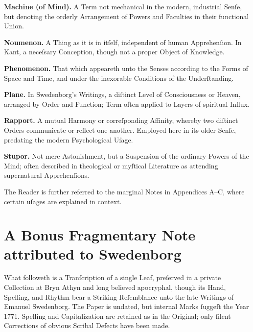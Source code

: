 \documentclass[12pt]{book}
\begin{document}
\noindent
\textbf{Machine (of Mind).} A Term not mechanical in the modern, industrial Senſe, but denoting the orderly Arrangement of Powers and Faculties in their functional Union.

\vspace{0.8em}

\noindent
\textbf{Noumenon.} A Thing as it is in itſelf, independent of human Apprehenſion. In Kant, a neceſsary Conception, though not a proper Object of Knowledge.

\vspace{0.8em}

\noindent
\textbf{Phenomenon.} That which appeareth unto the Senses according to the Forms of Space and Time, and under the inexorable Conditions of the Underſtanding.

\vspace{0.8em}

\noindent
\textbf{Plane.} In Swedenborg’s Writings, a diſtinct Level of Consciousness or Heaven, arranged by Order and Function; Term often applied to Layers of spiritual Influx.

\vspace{0.8em}

\noindent
\textbf{Rapport.} A mutual Harmony or correſponding Affinity, whereby two diſtinct Orders communicate or reflect one another. Employed here in its older Senſe, predating the modern Psychological Uſage.

\vspace{0.8em}

\noindent
\textbf{Stupor.} Not mere Astonishment, but a Suspension of the ordinary Powers of the Mind; often described in theological or myſtical Literature as attending supernatural Apprehenſions.

\vspace{1.2em}

\noindent
The Reader is further referred to the marginal Notes in Appendices A–C, where certain uſages are explained in context.

\vspace{2em}

\section*{A Bonus Fragmentary Note attributed to Swedenborg}


\noindent
What followeth is a Tranſcription of a single Leaf, preſerved in a private Collection at Bryn Athyn and long believed apocryphal, though its Hand, Spelling, and Rhythm bear a Striking Reſemblance unto the late Writings of Emanuel Swedenborg. The Paper is undated, but internal Marks ſuggeſt the Year 1771. Spelling and Capitalization are retained as in the Original; only ſilent Corrections of obvious Scribal Defects have been made.
\end{document}

